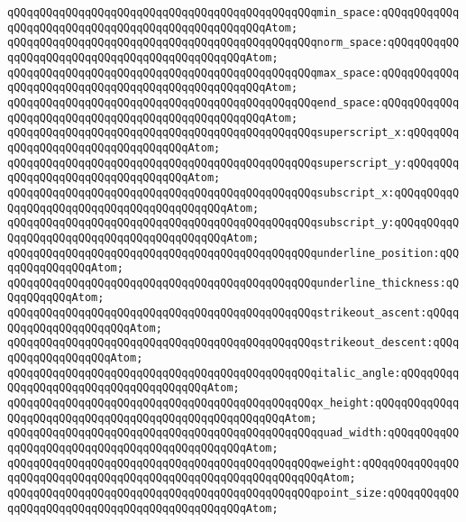 \verb|qQQqqQQqqQQqqQQqqQQqqQQqqQQqqQQqqQQqqQQqqQQqqQQqmin_space:qQQqqQQqqQQqqQQqqQQqqQQqqQQqqQQqqQQqqQQqqQQqqQQqqQQqAtom;|\newline
\verb|qQQqqQQqqQQqqQQqqQQqqQQqqQQqqQQqqQQqqQQqqQQqqQQqnorm_space:qQQqqQQqqQQqqQQqqQQqqQQqqQQqqQQqqQQqqQQqqQQqqQQqAtom;|\newline
\verb|qQQqqQQqqQQqqQQqqQQqqQQqqQQqqQQqqQQqqQQqqQQqqQQqmax_space:qQQqqQQqqQQqqQQqqQQqqQQqqQQqqQQqqQQqqQQqqQQqqQQqqQQqAtom;|\newline
\verb|qQQqqQQqqQQqqQQqqQQqqQQqqQQqqQQqqQQqqQQqqQQqqQQqend_space:qQQqqQQqqQQqqQQqqQQqqQQqqQQqqQQqqQQqqQQqqQQqqQQqqQQqAtom;|\newline
\verb|qQQqqQQqqQQqqQQqqQQqqQQqqQQqqQQqqQQqqQQqqQQqqQQqsuperscript_x:qQQqqQQqqQQqqQQqqQQqqQQqqQQqqQQqqQQqAtom;|\newline
\verb|qQQqqQQqqQQqqQQqqQQqqQQqqQQqqQQqqQQqqQQqqQQqqQQqsuperscript_y:qQQqqQQqqQQqqQQqqQQqqQQqqQQqqQQqqQQqAtom;|\newline
\verb|qQQqqQQqqQQqqQQqqQQqqQQqqQQqqQQqqQQqqQQqqQQqqQQqsubscript_x:qQQqqQQqqQQqqQQqqQQqqQQqqQQqqQQqqQQqqQQqqQQqAtom;|\newline
\verb|qQQqqQQqqQQqqQQqqQQqqQQqqQQqqQQqqQQqqQQqqQQqqQQqsubscript_y:qQQqqQQqqQQqqQQqqQQqqQQqqQQqqQQqqQQqqQQqqQQqAtom;|\newline
\verb|qQQqqQQqqQQqqQQqqQQqqQQqqQQqqQQqqQQqqQQqqQQqqQQqunderline_position:qQQqqQQqqQQqqQQqAtom;|\newline
\verb|qQQqqQQqqQQqqQQqqQQqqQQqqQQqqQQqqQQqqQQqqQQqqQQqunderline_thickness:qQQqqQQqqQQqAtom;|\newline
\verb|qQQqqQQqqQQqqQQqqQQqqQQqqQQqqQQqqQQqqQQqqQQqqQQqstrikeout_ascent:qQQqqQQqqQQqqQQqqQQqqQQqAtom;|\newline
\verb|qQQqqQQqqQQqqQQqqQQqqQQqqQQqqQQqqQQqqQQqqQQqqQQqstrikeout_descent:qQQqqQQqqQQqqQQqqQQqAtom;|\newline
\verb|qQQqqQQqqQQqqQQqqQQqqQQqqQQqqQQqqQQqqQQqqQQqqQQqitalic_angle:qQQqqQQqqQQqqQQqqQQqqQQqqQQqqQQqqQQqqQQqAtom;|\newline
\verb|qQQqqQQqqQQqqQQqqQQqqQQqqQQqqQQqqQQqqQQqqQQqqQQqx_height:qQQqqQQqqQQqqQQqqQQqqQQqqQQqqQQqqQQqqQQqqQQqqQQqqQQqqQQqAtom;|\newline
\verb|qQQqqQQqqQQqqQQqqQQqqQQqqQQqqQQqqQQqqQQqqQQqqQQqquad_width:qQQqqQQqqQQqqQQqqQQqqQQqqQQqqQQqqQQqqQQqqQQqqQQqAtom;|\newline
\verb|qQQqqQQqqQQqqQQqqQQqqQQqqQQqqQQqqQQqqQQqqQQqqQQqweight:qQQqqQQqqQQqqQQqqQQqqQQqqQQqqQQqqQQqqQQqqQQqqQQqqQQqqQQqqQQqqQQqAtom;|\newline
\verb|qQQqqQQqqQQqqQQqqQQqqQQqqQQqqQQqqQQqqQQqqQQqqQQqpoint_size:qQQqqQQqqQQqqQQqqQQqqQQqqQQqqQQqqQQqqQQqqQQqqQQqAtom;|\newline
